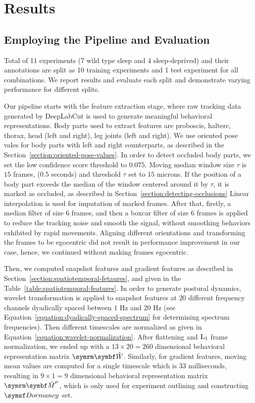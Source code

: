 \chapter{Results}

\section{Employing the Pipeline and  Evaluation}\label{section:employing-proposed-pipeline}
Total of 11 experiments (7 wild type sleep and 4 sleep-deprived) and their annotations are split as 10 training experiments and 1 test experiment for all combinations.
We report results and evaluate each split and demonstrate varying performance for different splits.

Our pipeline starts with the feature extraction stage, where raw tracking data generated by DeepLabCut is used to generate meaningful behavioral representations.
Body parts used to extract features are proboscis, haltere, thorax, head (left and right), leg joints (left and right).
We use oriented pose vales for body parts with left and right counterparts, as described in the Section~\ref{section:oriented-pose-values}.
In order to detect occluded body parts, we set the low confidence score threshold to $0.075$.
Moving median window size $\tau$ is $15$ frames, ($0.5$ seconds) and threshold $\tau$ set to $15$ microns. If the position of a body part exceeds the median of the window centered around it by $\tau$, it is marked as occluded, as described in Section~\ref{section:detecting-occlusions}
Linear interpolation is used for imputation of marked frames.
After that, firstly, a median filter of size $6$ frames, and then a boxcar filter of size $6$ frames is applied to reduce the tracking noise and smooth the signal, without smoothing behaviors exhibited by rapid movements.
Aligning different orientations and transforming the frames to be egocentric did not result in performance improvement in our case, hence, we continued without making frames egocentric.

Then, we computed snapshot features and gradient features as described in Section~\ref{section:spatiotemporal-fetaures}, and given in the Table~\ref{table:spatiotemporal-features}.
In order to generate postural dynamics, wavelet transformation is applied to snapshot features at $20$ different frequency channels dyadically spaced between $1$ Hz and $20$ Hz (see Equation~\ref{equation:dyadically-spaced-spectrum} for determining spectrum frequencies).
Then different timescales are normalized as given in Equation~\ref{equation:wavelet-normalization}.
After flattening and $\textnormal{L}_1$ frame normalization, we ended up with a $13 \times 20 = 260$ dimensional behavioral representation matrix $\V{\hat{W}}$.
Similarly, for gradient features, moving mean values are computed for a single timescale which is $33$ milliseconds, resulting in $9 \times 1 = 9$ dimensional behavioral representation matrix $\V{\hat{M}}^\mu$, which is only used for experiment outlining and constructing $\Dormancy$ set.

